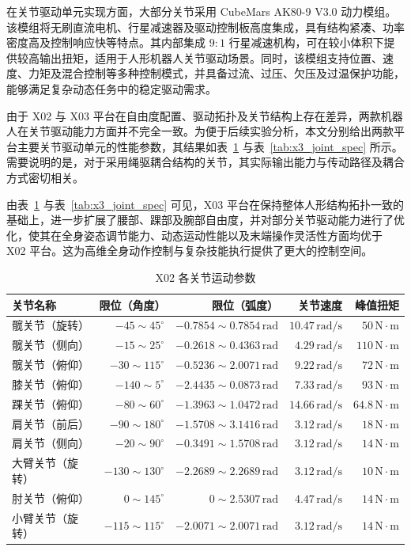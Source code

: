 在关节驱动单元实现方面，大部分关节采用 CubeMars AK80-9 V3.0 动力模组。该模组将无刷直流电机、行星减速器及驱动控制板高度集成，具有结构紧凑、功率密度高及控制响应快等特点。其内部集成 $9:1$ 行星减速机构，可在较小体积下提供较高输出扭矩，适用于人形机器人关节驱动场景。同时，该模组支持位置、速度、力矩及混合控制等多种控制模式，并具备过流、过压、欠压及过温保护功能，能够满足复杂动态任务中的稳定驱动需求。

由于 X02 与 X03 平台在自由度配置、驱动拓扑及关节结构上存在差异，两款机器人在关节驱动能力方面并不完全一致。为便于后续实验分析，本文分别给出两款平台主要关节驱动单元的性能参数，其结果如表~\ref{tab:x2_joint_spec} 与表~\ref{tab:x3_joint_spec} 所示。需要说明的是，对于采用绳驱耦合结构的关节，其实际输出能力与传动路径及耦合方式密切相关。

由表~\ref{tab:x2_joint_spec} 与表~\ref{tab:x3_joint_spec} 可见，X03 平台在保持整体人形结构拓扑一致的基础上，进一步扩展了腰部、踝部及腕部自由度，并对部分关节驱动能力进行了优化，使其在全身姿态调节能力、动态运动性能以及末端操作灵活性方面均优于 X02 平台。这为高维全身动作控制与复杂技能执行提供了更大的控制空间。

\begin{table}[htbp]
	\centering
	\caption{X02 各关节运动参数}
	\label{tab:x2_joint_spec}
	\begin{tabular}{lrrrr}
		\toprule
		关节名称 & 限位（角度） & 限位（弧度） & 关节速度 & 峰值扭矩 \\
		\midrule
		髋关节（旋转） & $-45 \sim 45^\circ$ & $-0.7854 \sim 0.7854\,\mathrm{rad}$ & $10.47\,\mathrm{rad/s}$ & $50\,\mathrm{N\cdot m}$ \\
		髋关节（侧向） & $-15 \sim 25^\circ$ & $-0.2618 \sim 0.4363\,\mathrm{rad}$ & $4.29\,\mathrm{rad/s}$ & $110\,\mathrm{N\cdot m}$ \\
		髋关节（俯仰） & $-30 \sim 115^\circ$ & $-0.5236 \sim 2.0071\,\mathrm{rad}$ & $9.22\,\mathrm{rad/s}$ & $72\,\mathrm{N\cdot m}$ \\
		膝关节（俯仰） & $-140 \sim 5^\circ$ & $-2.4435 \sim 0.0873\,\mathrm{rad}$ & $7.33\,\mathrm{rad/s}$ & $93\,\mathrm{N\cdot m}$ \\
		踝关节（俯仰） & $-80 \sim 60^\circ$ & $-1.3963 \sim 1.0472\,\mathrm{rad}$ & $14.66\,\mathrm{rad/s}$ & $64.8\,\mathrm{N\cdot m}$ \\
		肩关节（前后） & $-90 \sim 180^\circ$ & $-1.5708 \sim 3.1416\,\mathrm{rad}$ & $3.12\,\mathrm{rad/s}$ & $18\,\mathrm{N\cdot m}$ \\
		肩关节（侧向） & $-20 \sim 90^\circ$ & $-0.3491 \sim 1.5708\,\mathrm{rad}$ & $3.12\,\mathrm{rad/s}$ & $14\,\mathrm{N\cdot m}$ \\
		大臂关节（旋转） & $-130 \sim 130^\circ$ & $-2.2689 \sim 2.2689\,\mathrm{rad}$ & $3.12\,\mathrm{rad/s}$ & $10\,\mathrm{N\cdot m}$ \\
		肘关节（俯仰） & $0 \sim 145^\circ$ & $0 \sim 2.5307\,\mathrm{rad}$ & $4.47\,\mathrm{rad/s}$ & $14\,\mathrm{N\cdot m}$ \\
		小臂关节（旋转） & $-115 \sim 115^\circ$ & $-2.0071 \sim 2.0071\,\mathrm{rad}$ & $3.12\,\mathrm{rad/s}$ & $14\,\mathrm{N\cdot m}$ \\
		\bottomrule
	\end{tabular}
\end{table}


